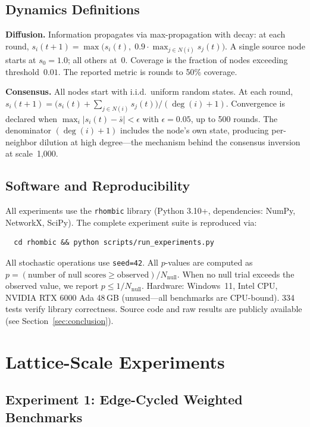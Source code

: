 \documentclass[11pt]{article}
\begin{document}
\subsection{Dynamics Definitions}

\textbf{Diffusion.} Information propagates via max-propagation with
decay: at each round,
$s_i(t{+}1) = \max\bigl(s_i(t),\; 0.9 \cdot \max_{j \in N(i)} s_j(t)\bigr)$.
A single source node starts at $s_0 = 1.0$; all others at~$0$.
Coverage is the fraction of nodes exceeding threshold~$0.01$.
The reported metric is rounds to 50\% coverage.

\textbf{Consensus.} All nodes start with i.i.d.\ uniform random states.
At each round,
$s_i(t{+}1) = \bigl(s_i(t) + \sum_{j \in N(i)} s_j(t)\bigr) / (\deg(i) + 1)$.
Convergence is declared when
$\max_i |s_i(t) - \bar{s}| < \epsilon$ with $\epsilon = 0.05$,
up to 500 rounds. The denominator $(\deg(i) + 1)$ includes the
node's own state, producing per-neighbor dilution at high
degree---the mechanism behind the consensus inversion at scale~1{,}000.

\subsection{Software and Reproducibility}

All experiments use the \texttt{rhombic} library (Python 3.10+,
dependencies: NumPy, NetworkX, SciPy). The complete experiment
suite is reproduced via:
\begin{verbatim}
  cd rhombic && python scripts/run_experiments.py
\end{verbatim}
All stochastic operations use \texttt{seed=42}. All $p$-values are
computed as $p = (\text{number of null scores} \geq \text{observed}) /
N_{\text{null}}$. When no null trial exceeds the observed value, we
report $p \leq 1/N_{\text{null}}$. Hardware: Windows~11,
Intel CPU, NVIDIA RTX 6000 Ada 48\,GB (unused---all benchmarks are
CPU-bound). 334 tests verify library correctness. Source code and
raw results are publicly available (see
Section~\ref{sec:conclusion}).

\section{Lattice-Scale Experiments}
\label{sec:lattice}

\subsection{Experiment 1: Edge-Cycled Weighted Benchmarks}
\end{document}
